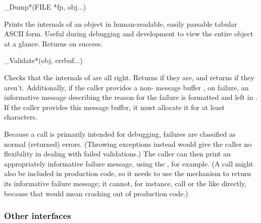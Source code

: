 \begin{sreapi}
\hypertarget{ifc:Dump}
{\item[\_Dump*(FILE *fp, obj...)]}

Prints the internals of an object in human-readable, easily parsable
tabular ASCII form. Useful during debugging and development to view
the entire object at a glance. Returns  on success.

\hypertarget{ifc:Validate}
{\item[\_Validate*(obj, errbuf...)]}

Checks that the internals of  are all right. Returns
 if they are, and returns  if they
aren't. Additionally, if the caller provides a non-
message buffer , on failure, an informative message
describing the reason for the failure is formatted and left in
. If the caller provides this message buffer, it must
allocate it for at least  characters.

Because a  call is primarily intended for
debugging, failures are classified as normal (returned) errors.
(Throwing exceptions instead would give the caller no flexibility in
dealing with failed validations.) The caller can then print an
appropriately informative failure message, using the ,
for example. (A  call might also be included in
production code, so it needs to use the  mechanism to
return its informative failure message; it cannot, for instance, call
 or the like directly, because that would mean
crashing out of production code.)

\end{sreapi}



\subsubsection{Other interfaces}

